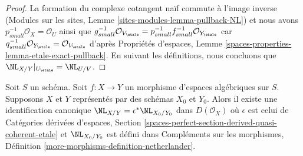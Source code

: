 \begin{proof}
La formation du complexe cotangent naïf commute à l'image inverse
(Modules sur les sites, Lemme \ref{sites-modules-lemma-pullback-NL})
et nous avons $p_{small}^{-1}\mathcal{O}_X = \mathcal{O}_U$ ainsi que
$g_{small}^{-1}\mathcal{O}_{V_\etale} =
p_{small}^{-1}f_{small}^{-1}\mathcal{O}_{Y_\etale}$
car $q_{small}^{-1}\mathcal{O}_{Y_\etale} =
\mathcal{O}_{V_\etale}$ d'après Propriétés d'espaces, Lemme
\ref{spaces-properties-lemma-etale-exact-pullback}.
En suivant les définitions, nous concluons que
$\NL_{X/Y}|_{U_\etale} = \NL_{U/V}$.
\end{proof}

\begin{lemma}
\label{lemma-NL-compare-spaces-schemes}
Soit $S$ un schéma. Soit $f : X \to Y$ un morphisme d'espaces algébriques
sur $S$. Supposons $X$ et $Y$ représentés par des schémas $X_0$ et $Y_0$.
Alors il existe une identification canonique
$\NL_{X/Y} = \epsilon^*\NL_{X_0/Y_0}$ dans $D(\mathcal{O}_X)$
où $\epsilon$ est celui de Catégories dérivées d'espaces, Section
\ref{spaces-perfect-section-derived-quasi-coherent-etale}
et $\NL_{X_0/Y_0}$ est défini dans
Compléments sur les morphismes, Définition
\ref{more-morphisms-definition-netherlander}.
\end{lemma}

